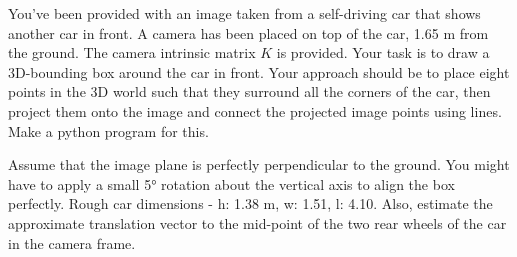 You've been provided with an image taken from a self-driving car that shows another car in front. A camera has been placed on top of the car, 1.65 m from the ground. The camera intrinsic matrix $K$ is provided.
Your task is to draw a 3D-bounding box around the car in front. Your approach should be to place eight points in the 3D world such that they surround all the corners of the car, then project them onto the image and connect the projected image points using lines. Make a python program for this.

Assume that the image plane is perfectly perpendicular to the ground.
You might have to apply a small 5° rotation about the vertical axis to align the box perfectly. 
Rough car dimensions - h: 1.38 m, w: 1.51, l: 4.10.
Also, estimate the approximate translation vector to the mid-point of the two rear wheels of the car in the camera frame.
